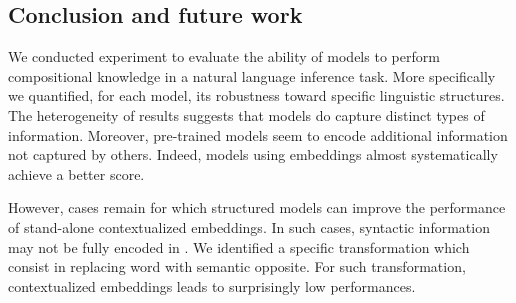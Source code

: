 

\subsection{Conclusion and future work}

We conducted experiment to evaluate the ability of models to perform compositional knowledge in a natural language inference task. More specifically we quantified, for each model, its robustness toward specific linguistic structures. The heterogeneity of results suggests that models do capture distinct types of information. Moreover, pre-trained \bert models seem to encode additional information not captured by others. Indeed, models using \bert embeddings almost systematically achieve a better score. 

However, cases remain for which structured models can improve the performance of stand-alone contextualized embeddings. In such cases, syntactic information may not be fully encoded in \bert. We identified a specific transformation which consist in replacing word with semantic opposite. For such transformation, \bert contextualized embeddings leads to surprisingly low performances.

